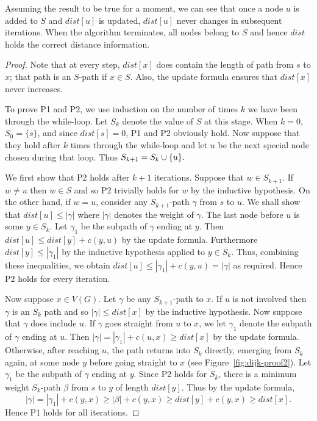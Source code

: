 \begin{note} Assuming the result to be true for a moment, we can see
that once a node $u$ is added to $S$ and $dist[u]$ is updated, $dist[u]$
never changes in subsequent iterations. When the algorithm terminates,
all nodes belong to $S$ and hence $dist$ holds the correct distance information.
\end{note}
\begin{proof} 
Note that at every step, $dist[x]$ does contain
the length of  path from $s$ to $x$; that path is an
$S$-path if $x\in S$. Also, the update formula ensures that $dist[x]$
never increases. 

To prove P1 and P2, we use induction on the number of times $k$ we
have been through the while-loop. Let $S_k$ denote the value of $S$
at this stage. When $k=0$, $S_0=\{s\}$, and since $dist[s]=0$, P1 and
P2 obviously hold. Now suppose that they hold after $k$ times through
the while-loop and let $u$ be the next special node chosen during that
loop. Thus $S_{k+1} = S_k \cup \mbox{$\{u\}$}.$

We first show that P2 holds after $k+1$ iterations. Suppose that
$w\in S_{k+1}$.  If $w\neq u$ then $w\in S$ and so P2 trivially
holds for $w$ by the inductive hypothesis. On the other hand,
if $w=u$, consider any $S_{k+1}$-path $\gamma$ from $s$ to $u$.
We shall show that $dist[u] \leq
|\gamma |$ where $| \gamma | $ denotes the weight of $\gamma$. The
last node before $u$ is some $y\in S_k$. Let $\gamma_1$ be the subpath
of $\gamma$ ending at $y$. Then $dist[u] \leq dist[y] + c(y,u)$ by the
update formula. Furthermore $dist[y] \leq |\gamma_1 |$ by the inductive
hypothesis applied to $y\in S_k$. Thus, combining these inequalities,
we obtain $dist[u] \leq |\gamma_1 | + c(y, u) = | \gamma |$ as
required. Hence P2 holds for every iteration.

Now suppose $x\in V(G)$. Let $\gamma$ be any $S_{k+1}$-path to $x$. If
$u$ is not involved then $\gamma$ is an $S_k$ path and so $|\gamma| \leq
dist[x]$ by the inductive hypothesis. Now suppose that $\gamma$ does
include $u$. 
If $\gamma$ goes straight from $u$ to $x$, we let $\gamma_1$ denote the 
subpath of $\gamma$ ending at $u$. Then $|\gamma| = |\gamma_1| + c(u,x) \geq 
dist[x]$ by the update formula. 
Otherwise, after reaching $u$, the path returns into $S_k$
directly, emerging from $S_k$ again, at some node $y$ before going
straight to $x$ (see Figure~\ref{fig:dijk-proof2}). Let $\gamma_1$
be the subpath of $\gamma$ ending at $y$. Since P2 holds for $S_k$,
there is a minimum weight $S_k$-path $\beta$ from $s$ to $y$ of length
$dist[y]$. Thus by the update formula, 
$$
|\gamma| = |\gamma_1| + c(y,
x) \geq |\beta| + c(y, x) \geq dist[y] + c(y, x) \geq dist[x].
$$ 
Hence P1 holds for all iterations.
\end{proof}

